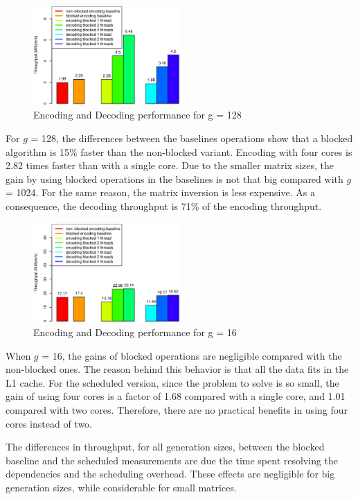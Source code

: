 \begin{figure}[h!]
\centering
\includegraphics[width=0.5\textwidth]{images/2015-04-18_encoding_decoding_128.eps}
\caption{Encoding and Decoding performance for g = 128}
\label{enc_dec128}
\end{figure}

For $g$ = 128, the differences between the baselines operations show that a
blocked algorithm is 15\% faster than the non-blocked variant. Encoding with
four cores is 2.82 times faster than with a single core. Due to the smaller
matrix sizes, the gain by using blocked operations in the baselines is not that
big compared with $g$ = 1024. For the same reason, the matrix inversion is less
expensive. As a consequence, the decoding throughput is 71\% of the encoding
throughput.

\begin{figure}[h!]
\centering
\includegraphics[width=0.5\textwidth]{images/2015-04-18_encoding_decoding_16.eps}
\caption{Encoding and Decoding performance for g = 16}
\label{enc_dec16}
\end{figure}

When $g$ = 16, the gains of blocked operations are negligible compared with the
non-blocked ones. The reason behind this behavior is that all the data fits in
the L1 cache. For the scheduled version, since the problem to solve is so small,
the gain of using four cores is a factor of 1.68 compared with a single core,
and 1.01 compared with two cores. Therefore, there are no practical benefits in
using four cores instead of two.

The differences in throughput, for all generation sizes, between the blocked
baseline and the scheduled measurements are due the time spent resolving the
dependencies and the scheduling overhead. These effects are negligible for big
generation sizes, while considerable for small matrices.

